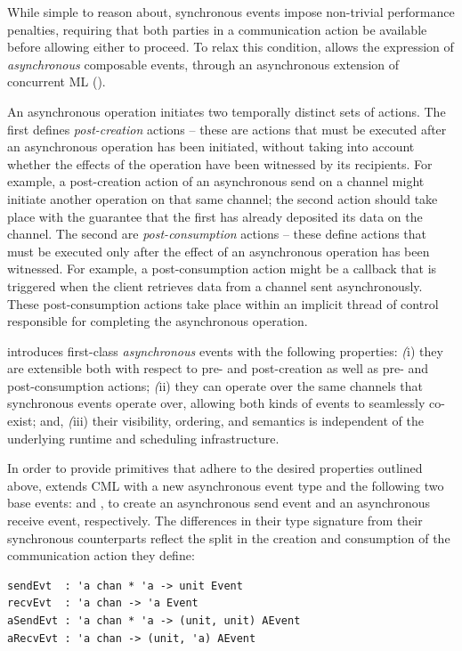 While simple to reason about, synchronous events impose non-trivial performance
penalties, requiring that both parties in a communication action be available
before allowing either to proceed.  To relax this condition, \MM allows the
expression of \emph{asynchronous} composable events, through an asynchronous
extension of concurrent ML (\acml).

An asynchronous operation initiates two temporally distinct sets of actions.
The first defines {\em post-creation} actions -- these are actions that must be
executed after an asynchronous operation has been initiated, without taking
into account whether the effects of the operation have been witnessed by its
recipients.  For example, a post-creation action of an asynchronous send on a
channel might initiate another operation on that same channel; the second
action should take place with the guarantee that the first has already
deposited its data on the channel.  The second are {\em post-consumption}
actions -- these define actions that must be executed only after the effect of
an asynchronous operation has been witnessed.  For example, a post-consumption
action might be a callback that is triggered when the client retrieves data
from a channel sent asynchronously.  These post-consumption actions take place
within an implicit thread of control responsible for completing the
asynchronous operation.

\acml introduces first-class {\em asynchronous} events with the following
properties: {\emph (i)} they are extensible both with respect to pre- and
post-creation as well as pre- and post-consumption actions; {\emph (ii)} they
can operate over the same channels that synchronous events operate over,
allowing both kinds of events to seamlessly co-exist; and, {\emph (iii)} their
visibility, ordering, and semantics is independent of the underlying runtime
and scheduling infrastructure.

In order to provide primitives that adhere to the desired properties outlined
above, \acml extends CML with a new asynchronous event type 
and the following two base events:  and , to create
an asynchronous send event and an asynchronous receive event, respectively. The
differences in their type signature from their synchronous counterparts reflect
the split in the creation and consumption of the communication action they
define:
\vspace{5mm}

\lstset{numbers=none}
\begin{lstlisting}
sendEvt  : 'a chan * 'a -> unit Event
recvEvt  : 'a chan -> 'a Event
aSendEvt : 'a chan * 'a -> (unit, unit) AEvent
aRecvEvt : 'a chan -> (unit, 'a) AEvent
\end{lstlisting}

